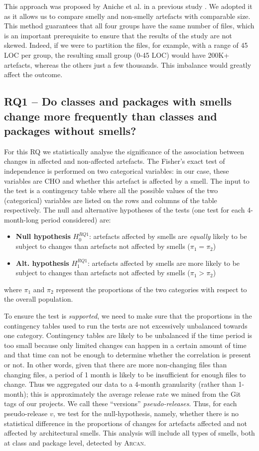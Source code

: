 This approach was proposed by Aniche et al. in a previous study \cite{Aniche2018}. We adopted it as it  allows us to compare smelly and non-smelly artefacts with comparable size.
This method guarantees that all four groups have the same number of files, which is an important prerequisite to ensure that the results of the study are not skewed. Indeed, if we were to partition the files, for example, with a range of 45 LOC per group, the resulting small group (0-45 LOC) would have 200K+ artefacts, whereas the others just a few thousands. This imbalance would greatly affect the outcome. 


\subsection{RQ1 -- Do classes and packages with smells change more frequently than classes and packages without smells?}
For this RQ we statistically analyse the significance of the association between changes in affected and non-affected artefacts.
The Fisher's exact test of independence \cite{Sheskin2007} is performed on two categorical variables: in our case, these variables are CHO and whether this artefact is affected by a smell.
The input to the test is a contingency table where all the possible values of the two (categorical) variables are listed on the rows and columns of the table respectively. 
The null and alternative hypotheses of the tests (one test for each 4-month-long period considered) are:
\begin{itemize}
    \item \textbf{Null hypothesis} $H^{RQ1}_0$: artefacts affected by smells are \textit{equally} likely to be subject to changes than artefacts not affected by smells ($\pi_1 = \pi_2$)
    \item \textbf{Alt. hypothesis} $H^{RQ1}_1$: artefacts affected by smells are more likely to be subject to changes than artefacts not affected by smells ($\pi_1 > \pi_2$)
\end{itemize}
where $\pi_1$ and $\pi_2$ represent the proportions of the two categories with respect to the overall population.

To ensure the test is \emph{supported}, we need to make sure that the proportions in the contingency tables used to run the tests are not excessively unbalanced towards one category. Contingency tables are likely to be unbalanced if the time period is too small because only limited changes can happen in a certain amount of time and that time can not be enough to determine whether the correlation is present or not.
In other words, given that there are more non-changing files than changing files, a period of 1 month is likely to be insufficient for enough files to change.
Thus we aggregated our data to a 4-month granularity (rather than 1-month); this is approximately the average release rate we mined from the Git tags of our projects. We call these ``versions'' \emph{pseudo-releases}.
Thus, for each pseudo-release $v$, we test for the null-hypothesis, namely, whether there is no statistical difference in the proportions of changes for artefacts affected and not affected by architectural smells. 
This analysis will include all types of smells, both at class and package level, detected by \textsc{Arcan}.


